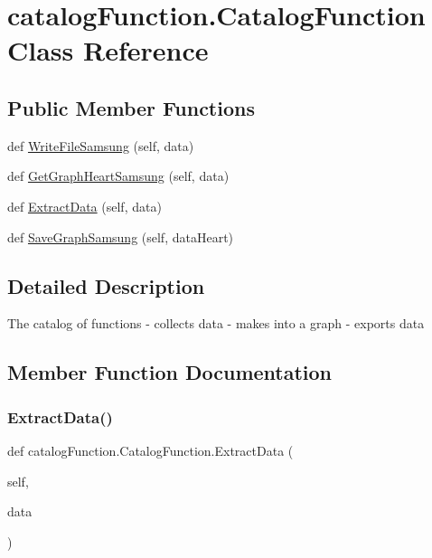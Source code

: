 \hypertarget{classcatalog_function_1_1_catalog_function}{}\section{catalog\+Function.\+Catalog\+Function Class Reference}
\label{classcatalog_function_1_1_catalog_function}
\subsection*{Public Member Functions}
\begin{DoxyCompactItemize}
\item 
def \hyperlink{classcatalog_function_1_1_catalog_function_a1c9af8a49037e222e32418d430f91d2d}{Write\+File\+Samsung} (self, data)
\item 
def \hyperlink{classcatalog_function_1_1_catalog_function_a09b360308d4ce6654cfb88769dfaa52e}{Get\+Graph\+Heart\+Samsung} (self, data)
\item 
def \hyperlink{classcatalog_function_1_1_catalog_function_a08005a486fe67eb62681357e3d7430d6}{Extract\+Data} (self, data)
\item 
def \hyperlink{classcatalog_function_1_1_catalog_function_ae64288ab8ea8adef0057f8147f2607e9}{Save\+Graph\+Samsung} (self, data\+Heart)
\end{DoxyCompactItemize}


\subsection{Detailed Description}
\begin{DoxyVerb}    The catalog of functions
     - collects data
     - makes into a graph
     - exports data
\end{DoxyVerb}
 

\subsection{Member Function Documentation}
\mbox{\label{classcatalog_function_1_1_catalog_function_a08005a486fe67eb62681357e3d7430d6}} 
\subsubsection{\texorpdfstring{Extract\+Data()}{ExtractData()}}
{\footnotesize\ttfamily def catalog\+Function.\+Catalog\+Function.\+Extract\+Data (\begin{DoxyParamCaption}\item[{}]{self,  }\item[{}]{data }\end{DoxyParamCaption})}

